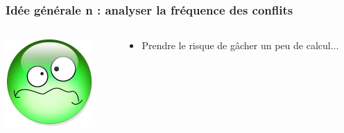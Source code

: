 \documentclass[xcolor={x11names,svgnames}]{beamer}
\begin{document}

\begin{frame}[label=idea1]
  \frametitle{Idée générale n : \textbf{analyser la fréquence des conflits}}

  \begin{columns}[c]
    \begin{column}{.1\textwidth}
      \vspace{1mm}
      \includegraphics[width=\textwidth]{triste.png}
    \end{column}
    
    \begin{column}{.9\textwidth}
      \begin{itemize}
      \item Prendre le risque de gâcher un peu de calcul...
      \end{itemize}
    \end{column}
  \end{columns}

  \vspace{1cm}
  

\end{frame}
\end{document}
